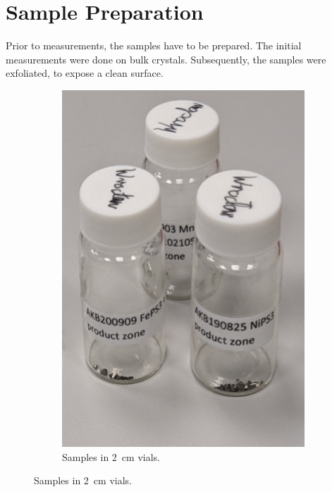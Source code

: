 \documentclass[
	oneside,
	parskip=half,
	a4paper,
]{scrbook}
\begin{document}
\section{Sample Preparation}
Prior to measurements, the samples have to be prepared.
The initial measurements were done on bulk crystals.
Subsequently, the samples were exfoliated, to expose a clean surface.
\begin{figure}
	\centering
	\begin{subfigure}[c]{.25\textwidth}
		\includegraphics[width=\textwidth]{../../photos/bulk_sample.jpg}
		\caption{Samples in \SI{2}{cm} vials.}
		\label{fig:samples_vials}
	\end{subfigure}

\end{figure}
\end{document}

